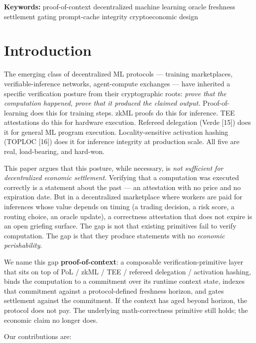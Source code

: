 \documentclass[11pt]{article}
\begin{document}
\noindent\textbf{Keywords:} proof-of-context \textperiodcentered{} decentralized machine learning \textperiodcentered{} oracle freshness \textperiodcentered{} settlement gating \textperiodcentered{} prompt-cache integrity \textperiodcentered{} cryptoeconomic design

\section{Introduction}

The emerging class of decentralized ML protocols --- training marketplaces, verifiable-inference networks, agent-compute exchanges --- have inherited a specific verification posture from their cryptographic roots: \emph{prove that the computation happened, prove that it produced the claimed output.} Proof-of-learning does this for training steps. zkML proofs do this for inference. TEE attestations do this for hardware execution. Refereed delegation (Verde [15]) does it for general ML program execution. Locality-sensitive activation hashing (TOPLOC [16]) does it for inference integrity at production scale. All five are real, load-bearing, and hard-won.

This paper argues that this posture, while necessary, is \emph{not sufficient for decentralized economic settlement}. Verifying that a computation was executed correctly is a statement about the past --- an attestation with no price and no expiration date. But in a decentralized marketplace where workers are paid for inferences whose value depends on timing (a trading decision, a risk score, a routing choice, an oracle update), a correctness attestation that does not expire is an open griefing surface. The gap is not that existing primitives fail to verify computation. The gap is that they produce statements with no \emph{economic perishability}.

We name this gap \textbf{proof-of-context}: a composable verification-primitive layer that sits on top of PoL / zkML / TEE / refereed delegation / activation hashing, binds the computation to a commitment over its runtime context state, indexes that commitment against a protocol-defined freshness horizon, and gates settlement against the commitment. If the context has aged beyond horizon, the protocol does not pay. The underlying math-correctness primitive still holds; the economic claim no longer does.

Our contributions are:
\end{document}
